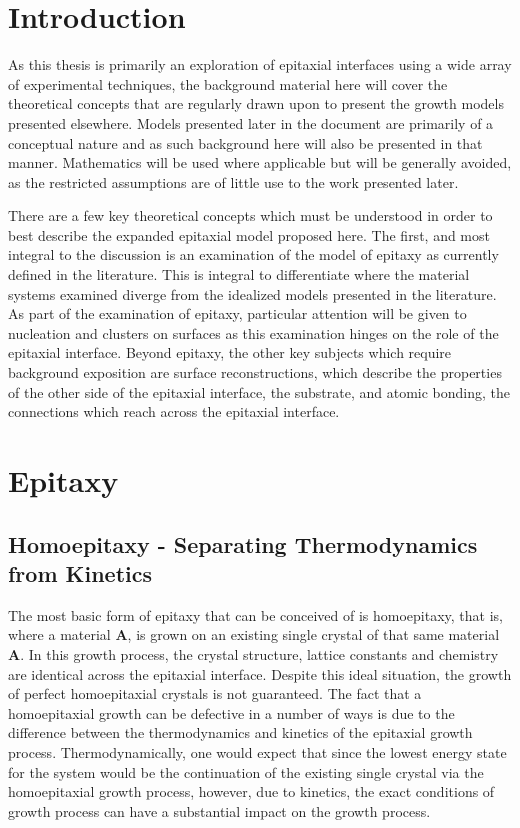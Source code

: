 \section{Introduction}
As this thesis is primarily an exploration of epitaxial interfaces using a wide array of experimental techniques, the background material here will cover the theoretical concepts that are regularly drawn upon to present the growth models presented elsewhere. Models presented later in the document are primarily of a conceptual nature and as such background here will also be presented in that manner. Mathematics will be used where applicable but will be generally avoided, as the restricted assumptions are of little use to the work presented later.

There are a few key theoretical concepts which must be understood in order to best describe the expanded epitaxial model proposed here. The first, and most integral to the discussion is an examination of the model of epitaxy as currently defined in the literature. This is integral to differentiate where the material systems examined diverge from the idealized models presented in the literature. As part of the examination of epitaxy, particular attention will be given to nucleation and clusters on surfaces as this examination hinges on the role of the epitaxial interface. Beyond epitaxy, the other key subjects which require background exposition are surface reconstructions, which describe the properties of the other side of the epitaxial interface, the substrate, and atomic bonding, the connections which reach across the epitaxial interface.

\section{Epitaxy}
\subsection{Homoepitaxy - Separating Thermodynamics from Kinetics}
The most basic form of epitaxy that can be conceived of is homoepitaxy, that is, where a material \textbf{A}, is grown on an existing single crystal of that same material \textbf{A}. In this growth process, the crystal structure, lattice constants and chemistry are identical across the epitaxial interface. Despite this ideal situation, the growth of perfect homoepitaxial crystals is not guaranteed. The fact that a homoepitaxial growth can be defective in a number of ways is due to the difference between the thermodynamics and kinetics of the epitaxial growth process. Thermodynamically, one would expect that since the lowest energy state for the system would be the continuation of the existing single crystal via the homoepitaxial growth process, however, due to kinetics, the exact conditions of growth process can have a substantial impact on the growth process.

